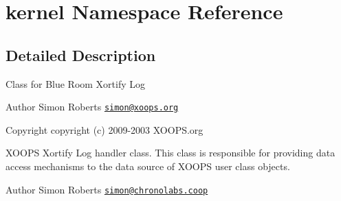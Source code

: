 \hypertarget{namespacekernel}{\section{kernel Namespace Reference}
\label{namespacekernel}
}


\subsection{Detailed Description}
Class for Blue Room Xortify Log \begin{DoxyAuthor}{Author}
Simon Roberts \href{mailto:simon@xoops.org}{\tt simon@xoops.\-org} 
\end{DoxyAuthor}
\begin{DoxyCopyright}{Copyright}
copyright (c) 2009-\/2003 X\-O\-O\-P\-S.\-org
\end{DoxyCopyright}
X\-O\-O\-P\-S Xortify Log handler class. This class is responsible for providing data access mechanisms to the data source of X\-O\-O\-P\-S user class objects.

\begin{DoxyAuthor}{Author}
Simon Roberts \href{mailto:simon@chronolabs.coop}{\tt simon@chronolabs.\-coop} 
\end{DoxyAuthor}
